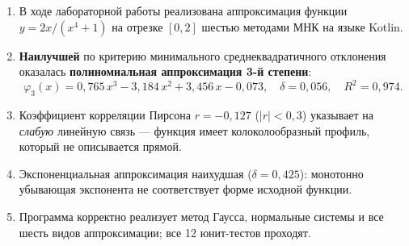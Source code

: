 \documentclass[12pt,a4paper]{article}
\begin{document}
\begin{enumerate}
  \item В ходе лабораторной работы реализована аппроксимация функции
        $y = 2x/(x^4+1)$ на отрезке $[0, 2]$ шестью методами МНК на языке Kotlin.

  \item \textbf{Наилучшей} по критерию минимального среднеквадратичного отклонения
        оказалась \textbf{полиномиальная аппроксимация 3-й степени}:
        \[
          \varphi_3(x) = 0{,}765\,x^3 - 3{,}184\,x^2 + 3{,}456\,x - 0{,}073,
          \quad \delta = 0{,}056, \quad R^2 = 0{,}974.
        \]

  \item Коэффициент корреляции Пирсона $r = -0{,}127$ ($|r| < 0{,}3$) указывает
        на \emph{слабую} линейную связь — функция имеет колоколообразный профиль,
        который не описывается прямой.

  \item Экспоненциальная аппроксимация наихудшая ($\delta = 0{,}425$): монотонно
        убывающая экспонента не соответствует форме исходной функции.

  \item Программа корректно реализует метод Гаусса, нормальные системы и
        все шесть видов аппроксимации; все 12 юнит-тестов проходят.
\end{enumerate}
\end{document}
